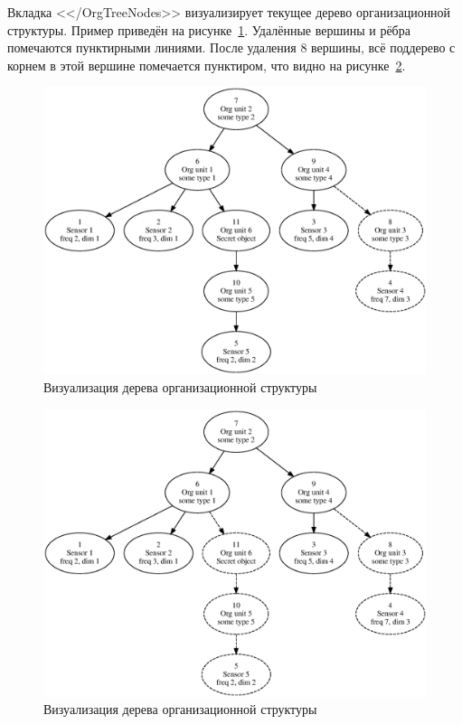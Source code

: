 Вкладка <</OrgTreeNodes>> визуализирует текущее дерево организационной структуры. Пример приведён на рисунке~\ref{demo1}. Удалённые вершины и рёбра помечаются пунктирными линиями. После удаления $8$ вершины, всё поддерево с корнем в этой вершине помечается пунктиром, что видно на рисунке~\ref{demo2}.

\begin{figure}
    \includegraphics[scale=0.6]{img/demo_del8.eps}
    \caption{Визуализация дерева организационной структуры}
    \label{demo1}
\end{figure}

\begin{figure}
    \includegraphics[scale=0.6]{img/demo_del8,11.eps}
    \caption{Визуализация дерева организационной структуры}
    \label{demo2}
\end{figure}

